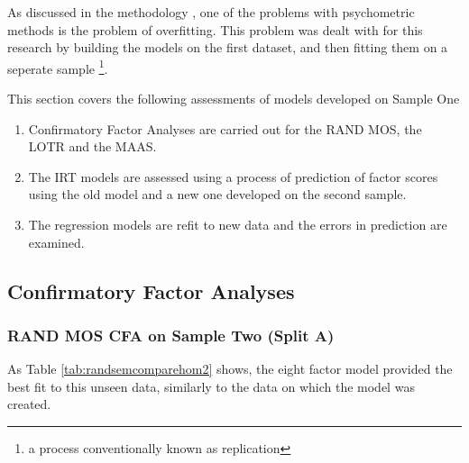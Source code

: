 \documentclass{article}
\begin{document}
As discussed in the methodology , one of the problems with psychometric methods is the problem of overfitting. This problem was dealt with for this research by building the models on the first dataset, and then fitting them on a seperate sample \footnote{a process conventionally known as replication}. 

This section covers the following assessments of models developed on Sample One

\begin{enumerate}
\item Confirmatory Factor Analyses are carried out for the RAND MOS, the LOTR and the MAAS. 

\item The IRT models are assessed using a process of prediction of factor scores using the old model and a new one developed on the second sample. 

\item The regression models are refit to new data and the errors in prediction are examined. 
\end{enumerate}




\subsection{Confirmatory Factor Analyses}
\label{sec:conf-fact-analys}




\subsubsection{RAND MOS CFA on Sample Two (Split A)}
\label{sec:rand-mos-cfa}






\begin{table}[ht]
\centering
{}
\caption{Model Comparison for RAND MOS data using Models from Sample 1 on Sample 2} 
\label{tab:randsemcomparehom2}
\end{table}
As Table \ref{tab:randsemcomparehom2} shows, the eight factor model provided the best fit to this unseen data, similarly to the data on which the model was created. 
\end{document}
